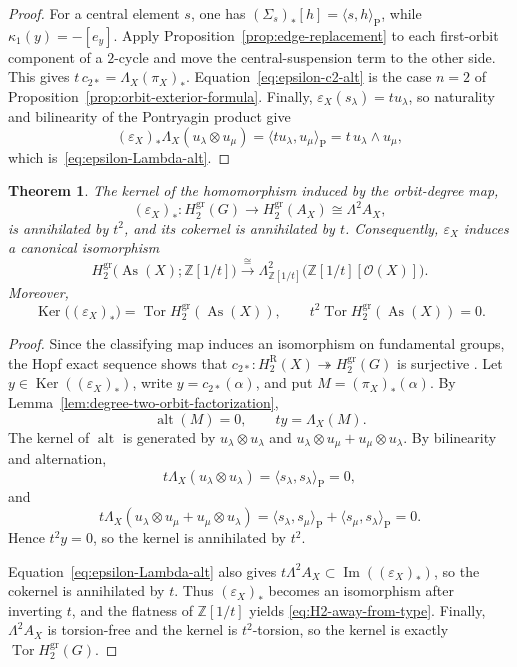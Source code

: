\documentclass[11pt]{article}
\newtheorem{theorem}{Theorem}[section]
\DeclareMathOperator{\As}{As}
\DeclareMathOperator{\Tor}{Tor}
\DeclareMathOperator{\Ker}{Ker}
\newcommand{\ZZ}{\mathbb Z}
\newcommand{\OO}{\mathcal O}
\newcommand{\gr}{\mathrm{gr}}
\newcommand{\R}{\mathrm R}
\begin{document}
\begin{proof}
For a central element $s$, one has
$(\Sigma_s)_*[h]=\langle s,h\rangle_{\mathrm P}$, while
$\kappa_1(y)=-[e_y]$. Apply Proposition~\ref{prop:edge-replacement} to each
first-orbit component of a $2$-cycle and move the central-suspension term to
the other side. This gives
$t\,c_{2*}=\Lambda_X(\pi_X)_*$. Equation~\eqref{eq:epsilon-c2-alt} is the case
$n=2$ of Proposition~\ref{prop:orbit-exterior-formula}. Finally,
$\varepsilon_X(s_\lambda)=t u_\lambda$, so naturality and bilinearity of the
Pontryagin product give
\[
 (\varepsilon_X)_*\Lambda_X(u_\lambda\otimes u_\mu)
 =\langle t u_\lambda,u_\mu\rangle_{\mathrm P}
 =t\,u_\lambda\wedge u_\mu,
\]
which is~\eqref{eq:epsilon-Lambda-alt}.
\end{proof}

\begin{theorem}
\label{thm:H2-away-from-type}
The kernel of the homomorphism induced by the orbit-degree map,
\[
 (\varepsilon_X)_*\colon H_2^{\gr}(G)
 \longrightarrow H_2^{\gr}(A_X)\cong\Lambda^2A_X,
\]
is annihilated by $t^2$, and its cokernel is annihilated by $t$.
Consequently, $\varepsilon_X$ induces a canonical isomorphism
\begin{equation}
 H_2^{\gr}\bigl(\As(X);\ZZ[1/t]\bigr)
 \xrightarrow{\ \cong\ }
 \Lambda^2_{\ZZ[1/t]}\bigl(\ZZ[1/t][\OO(X)]\bigr).
 \label{eq:H2-away-from-type}
\end{equation}
Moreover,
\[
 \Ker\bigl((\varepsilon_X)_*\bigr)=\Tor H_2^{\gr}(\As(X)),
 \qquad
 t^2\Tor H_2^{\gr}(\As(X))=0.
\]
\end{theorem}

\begin{proof}
Since the classifying map induces an isomorphism on fundamental groups, the
Hopf exact sequence shows that
$c_{2*}\colon H_2^\R(X)\twoheadrightarrow H_2^{\gr}(G)$ is surjective
\cite[Chapter~II, \S5]{Brown}. Let
$y\in\Ker((\varepsilon_X)_*)$, write $y=c_{2*}(\alpha)$, and put
$M=(\pi_X)_*(\alpha)$. By
Lemma~\ref{lem:degree-two-orbit-factorization},
\[
 \operatorname{alt}(M)=0,
 \qquad
 ty=\Lambda_X(M).
\]
The kernel of $\operatorname{alt}$ is generated by
$u_\lambda\otimes u_\lambda$ and
$u_\lambda\otimes u_\mu+u_\mu\otimes u_\lambda$. By bilinearity and
alternation,
\[
 t\Lambda_X(u_\lambda\otimes u_\lambda)
 =\langle s_\lambda,s_\lambda\rangle_{\mathrm P}=0,
\]
and
\[
 t\Lambda_X(u_\lambda\otimes u_\mu+u_\mu\otimes u_\lambda)
 =\langle s_\lambda,s_\mu\rangle_{\mathrm P}
 +\langle s_\mu,s_\lambda\rangle_{\mathrm P}=0.
\]
Hence $t^2y=0$, so the kernel is annihilated by $t^2$.

Equation~\eqref{eq:epsilon-Lambda-alt} also gives
$t\Lambda^2A_X\subset\operatorname{Im}((\varepsilon_X)_*)$, so the cokernel
is annihilated by $t$. Thus $(\varepsilon_X)_*$ becomes an isomorphism after
inverting $t$, and the flatness of $\ZZ[1/t]$ yields
\eqref{eq:H2-away-from-type}. Finally, $\Lambda^2A_X$ is torsion-free and the kernel is $t^2$-torsion,
so the kernel is exactly $\Tor H_2^{\gr}(G)$.
\end{proof}
\end{document}

